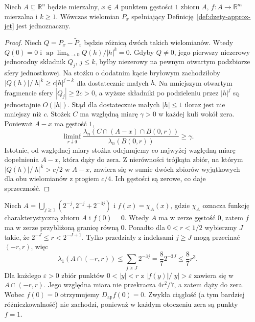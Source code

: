 \begin{lemat}
\label{lem:dzety-approx-unique}
Niech $A\subseteq\mathbb R^n$ będzie mierzalny,
$x\in A$ punktem gęstości $1$ zbioru $A$,
$f:A\to\mathbb R^m$ mierzalna i $k\ge1$.
Wówczas wielomian $P_x$ spełniający
Definicję~\ref{def:dzety-approx-jet} jest jednoznaczny.
\end{lemat}
\begin{proof}
Niech $Q=P_x-\widetilde P_x$ będzie różnicą dwóch takich
wielomianów. Wtedy $Q(0)=0$ i
$\operatorname{ap}\!\lim_{h\to0}Q(h)/|h|^k=0$.
Gdyby $Q\ne0$, jego pierwszy niezerowy jednorodny składnik
$Q_j$, $j\le k$, byłby niezerowy na pewnym otwartym
podzbiorze sfery jednostkowej. Na stożku o dodatnim kącie
bryłowym zachodziłoby
$|Q(h)|/|h|^k\ge c|h|^{j-k}$ dla dostatecznie małych $h$.
Na mniejszym otwartym fragmencie sfery $|Q_j|\ge2c>0$,
a wyższe składniki po podzieleniu przez $|h|^j$
są jednostajnie $O(|h|)$. Stąd dla dostatecznie
małych $|h|\le1$ iloraz jest nie mniejszy niż $c$.
Stożek $C$ ma względną miarę $\gamma>0$ w każdej
kuli wokół zera. Ponieważ $A-x$ ma gęstość $1$,
\[
 \liminf_{r\downarrow0}
 \frac{\lambda_n(C\cap(A-x)\cap B(0,r))}
 {\lambda_n(B(0,r))}\ge\gamma.
\]
Istotnie, od względnej miary stożka odejmujemy
co najwyżej względną miarę dopełnienia $A-x$,
która dąży do zera. Z nierówności trójkąta
zbiór, na którym $|Q(h)|/|h|^k>c/2$ w $A-x$,
zawiera się w sumie dwóch zbiorów wyjątkowych
dla obu wielomianów z progiem $c/4$.
Ich gęstości są zerowe, co daje sprzeczność.
\end{proof}

\begin{przyklad}
\label{ex:dzety-approx}
Niech $A=\bigcup_{j\ge1}(2^{-j},2^{-j}+2^{-3j})$
i $f(x)=\chi_A(x)$, gdzie $\chi_A$ oznacza funkcję
charakterystyczną zbioru $A$ i $f(0)=0$. Wtedy $A$ ma
w zerze gęstość $0$, zatem $f$ ma w zerze przybliżoną
granicę równą $0$. Ponadto
dla $0<r<1/2$ wybierzmy $J$ takie, że
$2^{-J}\le r<2^{-J+1}$. Tylko przedziały
z indeksami $j\ge J$ mogą przecinać $(-r,r)$,
więc
\[
 \lambda_1(A\cap(-r,r))\le
 \sum_{j\ge J}2^{-3j}=\frac{8}{7}2^{-3J}
 \le\frac87r^3.
\]
Dla każdego $\varepsilon>0$ zbiór punktów
$0<|y|<r$ z $|f(y)|/|y|>\varepsilon$ zawiera
się w $A\cap(-r,r)$. Jego względna miara
nie przekracza $4r^2/7$, a zatem dąży do zera.
Wobec $f(0)=0$ otrzymujemy $D_{\mathrm{ap}}f(0)=0$.
Zwykła ciągłość (a tym bardziej różniczkowalność) nie zachodzi,
ponieważ w każdym otoczeniu zera są punkty $f=1$.
\end{przyklad}

